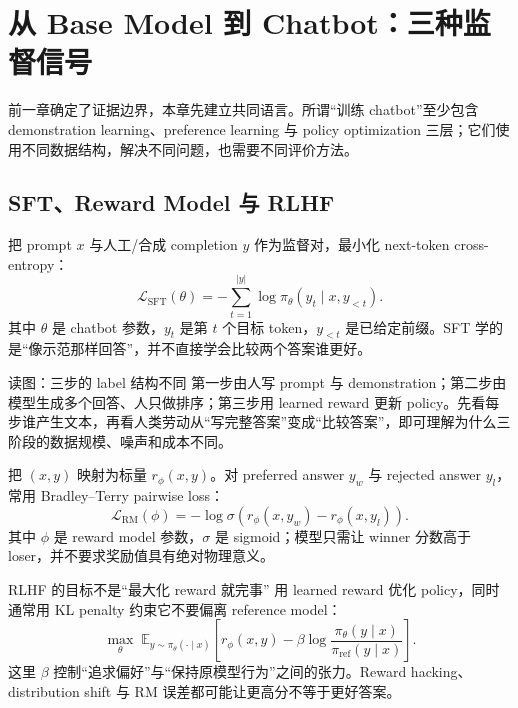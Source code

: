 \section{从 Base Model 到 Chatbot：三种监督信号}

前一章确定了证据边界，本章先建立共同语言。所谓“训练 chatbot”至少包含 demonstration learning、preference learning 与 policy optimization 三层；它们使用不同数据结构，解决不同问题，也需要不同评价方法。

\subsection{SFT、Reward Model 与 RLHF}

把 prompt $x$ 与人工/合成 completion $y$ 作为监督对，最小化 next-token cross-entropy：
\[
\mathcal{L}_{\mathrm{SFT}}(\theta)
=-\sum_{t=1}^{|y|}\log \pi_{\theta}(y_t\mid x,y_{<t}).
\]
其中 $\theta$ 是 chatbot 参数，$y_t$ 是第 $t$ 个目标 token，$y_{<t}$ 是已给定前缀。SFT 学的是“像示范那样回答”，并不直接学会比较两个答案谁更好。


\begin{knowledgebox}{读图：三步的 label 结构不同}
第一步由人写 prompt 与 demonstration；第二步由模型生成多个回答、人只做排序；第三步用 learned reward 更新 policy。先看每步谁产生文本，再看人类劳动从“写完整答案”变成“比较答案”，即可理解为什么三阶段的数据规模、噪声和成本不同。
\end{knowledgebox}

把 $(x,y)$ 映射为标量 $r_{\phi}(x,y)$。对 preferred answer $y_w$ 与 rejected answer $y_l$，常用 Bradley--Terry pairwise loss：
\[
\mathcal{L}_{\mathrm{RM}}(\phi)
=-\log \sigma\!\left(r_{\phi}(x,y_w)-r_{\phi}(x,y_l)\right).
\]
其中 $\phi$ 是 reward model 参数，$\sigma$ 是 sigmoid；模型只需让 winner 分数高于 loser，并不要求奖励值具有绝对物理意义。


\begin{importantbox}{RLHF 的目标不是“最大化 reward 就完事”}
用 learned reward 优化 policy，同时通常用 KL penalty 约束它不要偏离 reference model：
\[
\max_{\theta}\;\mathbb{E}_{y\sim\pi_{\theta}(\cdot\mid x)}
\left[r_{\phi}(x,y)-\beta\log\frac{\pi_{\theta}(y\mid x)}{\pi_{\mathrm{ref}}(y\mid x)}\right].
\]
这里 $\beta$ 控制“追求偏好”与“保持原模型行为”之间的张力。Reward hacking、distribution shift 与 RM 误差都可能让更高分不等于更好答案。
\end{importantbox}

